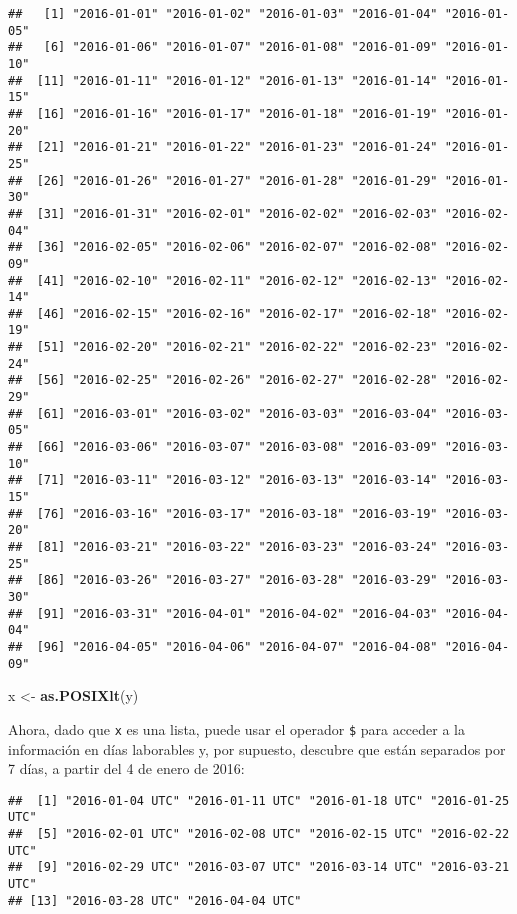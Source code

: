 \documentclass[]{article}
\newenvironment{Shaded}{\begin{snugshade}}{\end{snugshade}}
\newcommand{\KeywordTok}[1]{\textcolor[rgb]{0.13,0.29,0.53}{\textbf{#1}}}
\newcommand{\DecValTok}[1]{\textcolor[rgb]{0.00,0.00,0.81}{#1}}
\newcommand{\StringTok}[1]{\textcolor[rgb]{0.31,0.60,0.02}{#1}}
\newcommand{\OperatorTok}[1]{\textcolor[rgb]{0.81,0.36,0.00}{\textbf{#1}}}
\newcommand{\NormalTok}[1]{#1}
\begin{document}
\begin{verbatim}
##   [1] "2016-01-01" "2016-01-02" "2016-01-03" "2016-01-04" "2016-01-05"
##   [6] "2016-01-06" "2016-01-07" "2016-01-08" "2016-01-09" "2016-01-10"
##  [11] "2016-01-11" "2016-01-12" "2016-01-13" "2016-01-14" "2016-01-15"
##  [16] "2016-01-16" "2016-01-17" "2016-01-18" "2016-01-19" "2016-01-20"
##  [21] "2016-01-21" "2016-01-22" "2016-01-23" "2016-01-24" "2016-01-25"
##  [26] "2016-01-26" "2016-01-27" "2016-01-28" "2016-01-29" "2016-01-30"
##  [31] "2016-01-31" "2016-02-01" "2016-02-02" "2016-02-03" "2016-02-04"
##  [36] "2016-02-05" "2016-02-06" "2016-02-07" "2016-02-08" "2016-02-09"
##  [41] "2016-02-10" "2016-02-11" "2016-02-12" "2016-02-13" "2016-02-14"
##  [46] "2016-02-15" "2016-02-16" "2016-02-17" "2016-02-18" "2016-02-19"
##  [51] "2016-02-20" "2016-02-21" "2016-02-22" "2016-02-23" "2016-02-24"
##  [56] "2016-02-25" "2016-02-26" "2016-02-27" "2016-02-28" "2016-02-29"
##  [61] "2016-03-01" "2016-03-02" "2016-03-03" "2016-03-04" "2016-03-05"
##  [66] "2016-03-06" "2016-03-07" "2016-03-08" "2016-03-09" "2016-03-10"
##  [71] "2016-03-11" "2016-03-12" "2016-03-13" "2016-03-14" "2016-03-15"
##  [76] "2016-03-16" "2016-03-17" "2016-03-18" "2016-03-19" "2016-03-20"
##  [81] "2016-03-21" "2016-03-22" "2016-03-23" "2016-03-24" "2016-03-25"
##  [86] "2016-03-26" "2016-03-27" "2016-03-28" "2016-03-29" "2016-03-30"
##  [91] "2016-03-31" "2016-04-01" "2016-04-02" "2016-04-03" "2016-04-04"
##  [96] "2016-04-05" "2016-04-06" "2016-04-07" "2016-04-08" "2016-04-09"
\end{verbatim}

\begin{Shaded}
\begin{Highlighting}[]
\NormalTok{x <-}\StringTok{ }\KeywordTok{as.POSIXlt}\NormalTok{(y)}
\end{Highlighting}
\end{Shaded}

Ahora, dado que \texttt{x} es una lista, puede usar el operador
\texttt{\$} para acceder a la información en días laborables y, por
supuesto, descubre que están separados por 7 días, a partir del 4 de
enero de 2016:

\begin{Shaded}
\end{Shaded}

\begin{verbatim}
##  [1] "2016-01-04 UTC" "2016-01-11 UTC" "2016-01-18 UTC" "2016-01-25 UTC"
##  [5] "2016-02-01 UTC" "2016-02-08 UTC" "2016-02-15 UTC" "2016-02-22 UTC"
##  [9] "2016-02-29 UTC" "2016-03-07 UTC" "2016-03-14 UTC" "2016-03-21 UTC"
## [13] "2016-03-28 UTC" "2016-04-04 UTC"
\end{verbatim}
\end{document}

